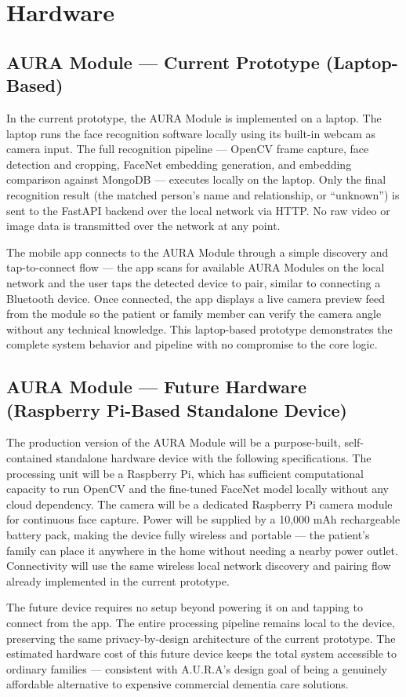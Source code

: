\section{Hardware}

\subsection{AURA Module --- Current Prototype (Laptop-Based)}
In the current prototype, the AURA Module is implemented on a laptop. The laptop runs the face recognition software locally using its built-in webcam as camera input. The full recognition pipeline --- OpenCV frame capture, face detection and cropping, FaceNet embedding generation, and embedding comparison against MongoDB --- executes locally on the laptop. Only the final recognition result (the matched person's name and relationship, or ``unknown'') is sent to the FastAPI backend over the local network via HTTP. No raw video or image data is transmitted over the network at any point.

The mobile app connects to the AURA Module through a simple discovery and tap-to-connect flow --- the app scans for available AURA Modules on the local network and the user taps the detected device to pair, similar to connecting a Bluetooth device. Once connected, the app displays a live camera preview feed from the module so the patient or family member can verify the camera angle without any technical knowledge. This laptop-based prototype demonstrates the complete system behavior and pipeline with no compromise to the core logic.

\subsection{AURA Module --- Future Hardware (Raspberry Pi-Based Standalone Device)}
The production version of the AURA Module will be a purpose-built, self-contained standalone hardware device with the following specifications. The processing unit will be a Raspberry Pi, which has sufficient computational capacity to run OpenCV and the fine-tuned FaceNet model locally without any cloud dependency. The camera will be a dedicated Raspberry Pi camera module for continuous face capture. Power will be supplied by a 10,000 mAh rechargeable battery pack, making the device fully wireless and portable --- the patient's family can place it anywhere in the home without needing a nearby power outlet. Connectivity will use the same wireless local network discovery and pairing flow already implemented in the current prototype.

The future device requires no setup beyond powering it on and tapping to connect from the app. The entire processing pipeline remains local to the device, preserving the same privacy-by-design architecture of the current prototype. The estimated hardware cost of this future device keeps the total system accessible to ordinary families --- consistent with A.U.R.A's design goal of being a genuinely affordable alternative to expensive commercial dementia care solutions.

